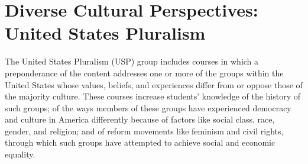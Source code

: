 \documentclass[
  letterpaper,
]{scrbook}
\begin{document}
\section{Diverse Cultural Perspectives: United States
Pluralism}\label{sec-diverse-cultural-perspectives-united-states}

The United States Pluralism (USP) group includes courses in which a
preponderance of the content addresses one or more of the groups within
the United States whose values, beliefs, and experiences differ from or
oppose those of the majority culture. These courses increase students'
knowledge of the history of such groups; of the ways members of these
groups have experienced democracy and culture in America differently
because of factors like social class, race, gender, and religion; and of
reform movements like feminism and civil rights, through which such
groups have attempted to achieve social and economic equality.
\end{document}
